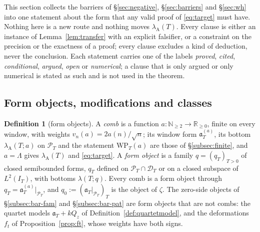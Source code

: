 \documentclass[11pt]{amsart}
\theoremstyle{definition}
\newtheorem{definition}[theorem]{Definition}
\theoremstyle{remark}
\newcommand{\R}{\mathbb R}
\newcommand{\N}{\mathbb N}
\newcommand{\PT}{\mathcal P_T}
\newcommand{\IT}{I_T}
\newcommand{\lamA}{\lambda_{\mathrm A}(T)}
\begin{document}
This section collects the barriers of \S\ref{sec:negative}, \S\ref{sec:barriers} and \S\ref{sec:wh} into one statement about
the form that any valid proof of \eqref{eq:target} must have. Nothing here is a new route and nothing moves $\lamA$. Every
clause is either an instance of Lemma~\ref{lem:transfer} with an explicit falsifier, or a constraint on the precision or the
exactness of a proof; every clause excludes a kind of deduction, never the conclusion. Each statement carries one of the labels
\emph{proved}, \emph{cited}, \emph{conditional}, \emph{argued}, \emph{open} or \emph{numerical}; a clause that is only argued or
only numerical is stated as such and is not used in the theorem.

\subsection{Form objects, modifications and classes}

\begin{definition}[form objects]\label{def:shape-obj}
A \emph{comb} is a function $a:\N_{\ge2}\to\R_{\ge0}$, finite on every window, with weights $v_n(a)=2a(n)/\sqrt n$; its window
form $\mathfrak a^{(a)}_T$, its bottom $\lambda_{\mathrm A}(T;a)$ on $\PT$ and the statement $\mathrm{WP}_T(a)$ are those of
\S\ref{subsec:finite}, and $a=\Lambda$ gives $\lamA$ and \eqref{eq:target}. A \emph{form object} is a family $q=(q_T)_{T>0}$ of
closed semibounded forms, $q_T$ defined on $\PT\cap\mathcal D_T$ or on a closed subspace of $L^2(\IT)$, with bottoms
$\lambda(T;q)$. Every comb is a form object through $q_T=\mathfrak a^{(a)}_T|_{\PT}$, and $q_0:=(\mathfrak a_T|_{\PT})_T$ is the
object of $\zeta$. The zero-side objects of \S\ref{subsec:bar-fam} and \S\ref{subsec:bar-pat} are form objects that are not combs:
the quartet models $\mathfrak a_T+kQ_z$ of Definition~\ref{def:quartetmodel}, and the deformations $f_t$ of
Proposition~\ref{prop:ft}, whose weights have both signs.
\end{definition}
\end{document}
